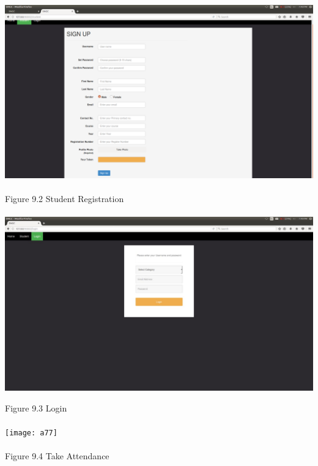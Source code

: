 \documentclass[a4paper, 12pt]{report}
\begin{document}
     \paragraph{}
     \paragraph{}
     \includegraphics[width=.9\textwidth]{studreg}\paragraph{}
    \hspace{5cm}Figure 9.2 Student Registration
    \newpage
\paragraph{}

\includegraphics[width=.9\textwidth]{login12}

     \hspace{5cm}Figure 9.3 Login
     \paragraph{}
     
     \texttt{[image: a77]}\paragraph{}
    \hspace{5cm} Figure 9.4 Take Attendance
    
\end{document}
